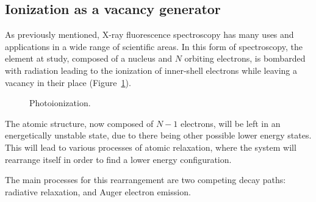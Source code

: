 \subsection{Ionization as a vacancy generator}

As previously mentioned, X-ray fluorescence spectroscopy has many uses and applications in a wide range of scientific areas. In this form of spectroscopy, the element at study, composed of a nucleus and $N$ orbiting electrons, is bombarded with radiation leading to the ionization of inner-shell electrons while leaving a vacancy in their place (Figure~\ref{fig:photoionization}).



\begin{figure}[h!]
    \centering
    \caption{Photoionization.}\label{fig:photoionization}
\end{figure}

The atomic structure, now composed of $N-1$ electrons, will be left in an energetically unstable state, due to there being other possible lower energy states. This will lead to various processes of atomic relaxation, where the system will rearrange itself in order to find a lower energy configuration.

The main processes for this rearrangement are two competing decay paths: radiative relaxation, and Auger electron emission.


